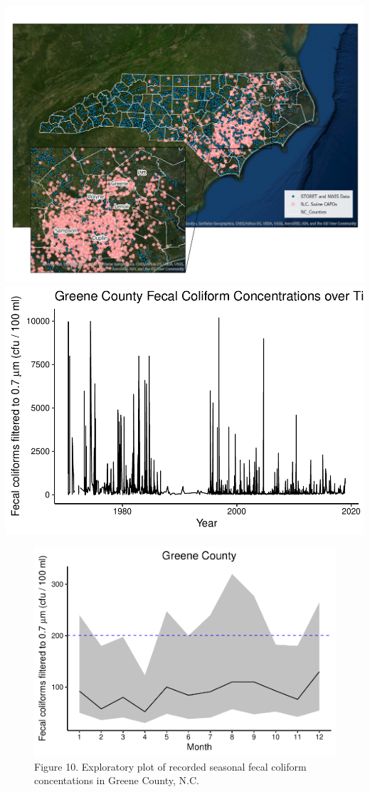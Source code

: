 \documentclass[12pt,]{article}
\begin{document}
\includegraphics{extent_map.png}
\includegraphics{Edmondson_ENV872_Project_files/figure-latex/unnamed-chunk-7-1.pdf}

\begin{figure}
\centering
\includegraphics{Edmondson_ENV872_Project_files/figure-latex/unnamed-chunk-9-1.pdf}
\caption{Figure 10. Exploratory plot of recorded seasonal fecal coliform
concentations in Greene County, N.C.}
\end{figure}
\end{document}
